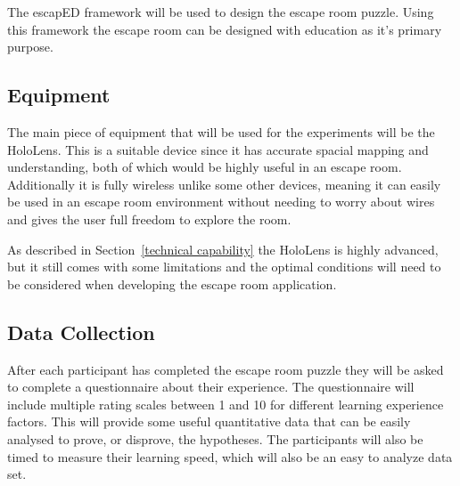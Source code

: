 \documentclass[journal]{IEEEtran}
\begin{document}
The escapED framework \cite{clarke_escaped:_2017} will be used to design the escape room puzzle. Using this framework the escape room can be designed with education as it's primary purpose.

\subsection{Equipment}
The main piece of equipment that will be used for the experiments will be the HoloLens. This is a suitable device since it has accurate spacial mapping and understanding, both of which would be highly useful in an escape room. Additionally it is fully wireless unlike some other devices, meaning it can easily be used in an escape room environment without needing to worry about wires and gives the user full freedom to explore the room.

As described in Section~\ref{technical capability} the HoloLens is highly advanced, but it still comes with some limitations and the optimal conditions will need to be considered when developing the escape room application.  

\subsection{Data Collection}
After each participant has completed the escape room puzzle they will be asked to complete a questionnaire about their experience. The questionnaire will include multiple rating scales between 1 and 10 for different learning experience factors. This will provide some useful quantitative data that can be easily analysed to prove, or disprove, the hypotheses.
The participants will also be timed to measure their learning speed, which will also be an easy to analyze data set. 







\end{document}
